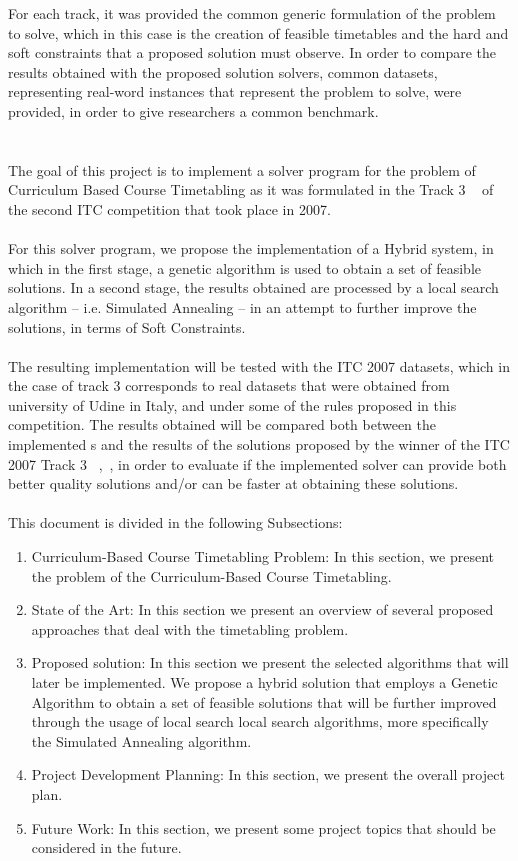 For each track, it was provided the common generic formulation of the problem to solve, which in this case is the creation of feasible timetables and the hard and soft constraints that a proposed solution must observe. In order to compare the results obtained with the proposed solution solvers, common datasets, representing real-word instances that represent the problem to solve, were provided, in order to give researchers a common benchmark.\\
\\
\\
The goal of this project is to implement a solver program for the problem of Curriculum Based Course Timetabling as it was formulated in the Track 3 ~\cite{McCollum2010} of the second ITC competition that took place in 2007.\\
\\
For this solver program, we propose the implementation of a Hybrid system, in which in the first stage, a genetic algorithm is used to obtain a set of feasible solutions. In a second stage, the results obtained are processed by a local search algorithm – i.e. Simulated Annealing – in an attempt to further improve the solutions, in terms of Soft Constraints.\\
\\
The resulting implementation will be tested with the ITC 2007 datasets, which in the case of track 3 corresponds to real datasets that were obtained from university of Udine in Italy, and under some of the rules proposed in this competition. The results obtained will be compared both between the implemented s and the results of the solutions proposed by the winner of the ITC 2007 Track 3 ~\cite{Muller},~\cite{Muller2009}, in order to evaluate if the implemented solver can provide both better quality solutions and/or can be faster at obtaining these solutions.\\
\\
This document is divided in the following Subsections:
\begin{enumerate}
\item Curriculum-Based Course Timetabling Problem: In this section, we present the problem of the Curriculum-Based Course Timetabling.
\item State of the Art: In this section we present an overview of several proposed approaches that deal with the timetabling problem.
\item Proposed solution: In this section we present the selected algorithms that will later be implemented. We propose a hybrid solution that employs a Genetic Algorithm to obtain a set of feasible solutions that will be further improved through the usage of local search local search algorithms, more specifically the Simulated Annealing algorithm.
\item Project Development Planning: In this section, we present the overall project plan.
\item Future Work: In this section, we present some project topics that should be considered in the future.
\end{enumerate}
\let\cleardoublepage\clearpage